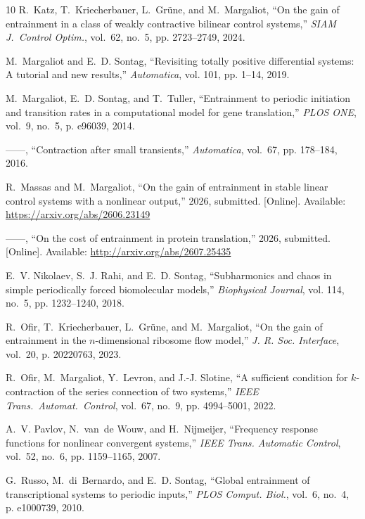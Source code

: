 \documentclass[onecolumn]{IEEEtran}
\begin{document}
\begin{thebibliography}{10}
R.~Katz, T.~Kriecherbauer, L.~Gr{\"u}ne, and M.~Margaliot, ``On the gain of entrainment in a class of weakly contractive bilinear control systems,'' \emph{SIAM J.\ Control Optim.}, vol.~62, no.~5, pp. 2723--2749, 2024.

M.~Margaliot and E.~D. Sontag, ``Revisiting totally positive differential systems: A tutorial and new results,'' \emph{Automatica}, vol. 101, pp. 1--14, 2019.

M.~Margaliot, E.~D. Sontag, and T.~Tuller, ``Entrainment to periodic initiation and transition rates in a computational model for gene translation,'' \emph{PLOS ONE}, vol.~9, no.~5, p. e96039, 2014.

------, ``Contraction after small transients,'' \emph{Automatica}, vol.~67, pp. 178--184, 2016.

\BIBentryALTinterwordspacing
R.~Massas and M.~Margaliot, ``On the gain of entrainment in stable linear control systems with a nonlinear output,'' 2026, submitted. [Online]. Available: \url{https://arxiv.org/abs/2606.23149}
\BIBentrySTDinterwordspacing

\BIBentryALTinterwordspacing
------, ``On the cost of entrainment in protein translation,'' 2026, submitted. [Online]. Available: \url{http://arxiv.org/abs/2607.25435}
\BIBentrySTDinterwordspacing

E.~V. Nikolaev, S.~J. Rahi, and E.~D. Sontag, ``Subharmonics and chaos in simple periodically forced biomolecular models,'' \emph{Biophysical Journal}, vol. 114, no.~5, pp. 1232--1240, 2018.

R.~Ofir, T.~Kriecherbauer, L.~Grüne, and M.~Margaliot, ``On the gain of entrainment in the $n$-dimensional ribosome flow model,'' \emph{J. R. Soc. Interface}, vol.~20, p. 20220763, 2023.

R.~Ofir, M.~Margaliot, Y.~Levron, and J.-J. Slotine, ``A sufficient condition for $k$-contraction of the series connection of two systems,'' \emph{IEEE Trans.\ Automat.\ Control}, vol.~67, no.~9, pp. 4994--5001, 2022.

A.~V. Pavlov, N.~van~de Wouw, and H.~Nijmeijer, ``Frequency response functions for nonlinear convergent systems,'' \emph{IEEE Trans. Automatic Control}, vol.~52, no.~6, pp. 1159--1165, 2007.

G.~Russo, M.~di~Bernardo, and E.~D. Sontag, ``Global entrainment of transcriptional systems to periodic inputs,'' \emph{PLOS Comput. Biol.}, vol.~6, no.~4, p. e1000739, 2010.


\end{thebibliography}
\end{document}
